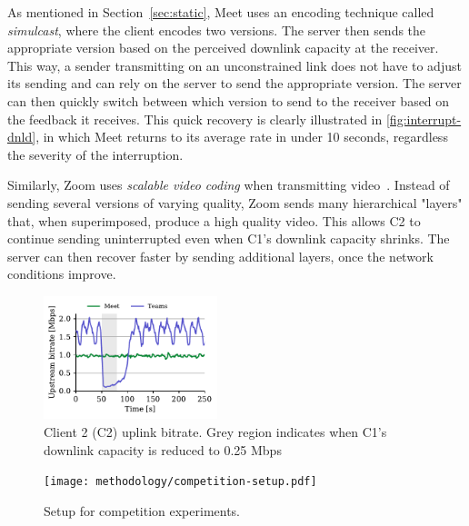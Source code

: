 As mentioned in Section~\ref{sec:static}, Meet uses an encoding technique called \textit{simulcast}, where the client encodes two versions. The server then sends the appropriate version based on the perceived downlink capacity at the receiver. This way, a sender transmitting on an unconstrained link does not have to adjust its sending and can rely on the server to send the appropriate version. The server can then quickly switch between which version to send to the receiver based on the feedback it receives. This quick recovery is clearly illustrated in \ref{fig:interrupt-dnld}, in which Meet returns to its average rate in under 10 seconds, regardless the severity of the interruption.

Similarly, Zoom uses \textit{scalable video coding} when transmitting video~\cite{zoom_encoding}. Instead of sending several versions of varying quality, Zoom sends many hierarchical "layers" that, when superimposed, produce a high quality video. This allows C2 to continue sending uninterrupted even when C1's downlink capacity shrinks. The server can then recover faster by sending additional layers, once the network conditions improve.  


\begin{figure}[t]
    \centering
    \includegraphics[width=0.45\textwidth,keepaspectratio]{../figures/interrupt/Interrupt-sender.pdf}
    \caption{Client 2 (C2) uplink bitrate. Grey region indicates when C1's downlink capacity is reduced to 0.25 Mbps}
    \label{fig:interrupt-sender}
\end{figure}

\begin{figure}[]
   \centering
    \texttt{[image: methodology/competition-setup.pdf]}
    \caption{Setup for competition experiments.}
    \label{fig:competition-setup}
\end{figure}

